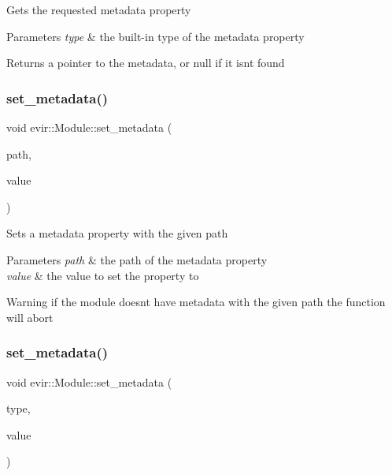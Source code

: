 Gets the requested metadata property 
\begin{DoxyParams}{Parameters}
{\em type} & the built-\/in type of the metadata property \\
\hline
\end{DoxyParams}
\begin{DoxyReturn}{Returns}
a pointer to the metadata, or null if it isn\textquotesingle{}t found 
\end{DoxyReturn}
\mbox{\label{classevir_1_1Module_ab245cceb132496f9c9ce5701158b5bab}} 
\subsubsection{\texorpdfstring{set\+\_\+metadata()}{set\_metadata()}\hspace{0.1cm}{\footnotesize\ttfamily [1/2]}}
{\footnotesize\ttfamily void evir\+::\+Module\+::set\+\_\+metadata (\begin{DoxyParamCaption}\item[{\hyperlink{classevir_1_1Metadata_a0a3a8f0c937238fae5262283bac6286a}{Metadata\+::path}}]{path,  }\item[{\hyperlink{classevir_1_1Value}{Value} $\ast$}]{value }\end{DoxyParamCaption})}

Sets a metadata property with the given path 
\begin{DoxyParams}{Parameters}
{\em path} & the path of the metadata property \\
\hline
{\em value} & the value to set the property to \\
\hline
\end{DoxyParams}
\begin{DoxyWarning}{Warning}
if the module doesn\textquotesingle{}t have metadata with the given path the function will abort 
\end{DoxyWarning}
\mbox{\label{classevir_1_1Module_a0522ae8c24fce527c2de575fc0550773}} 
\subsubsection{\texorpdfstring{set\+\_\+metadata()}{set\_metadata()}\hspace{0.1cm}{\footnotesize\ttfamily [2/2]}}
{\footnotesize\ttfamily void evir\+::\+Module\+::set\+\_\+metadata (\begin{DoxyParamCaption}\item[{\hyperlink{classevir_1_1Metadata_a292423b7a2d93f70382d1da4929f55a0}{Metadata\+::builtin\+\_\+property\+\_\+type}}]{type,  }\item[{\hyperlink{classevir_1_1Value}{Value} $\ast$}]{value }\end{DoxyParamCaption})}

